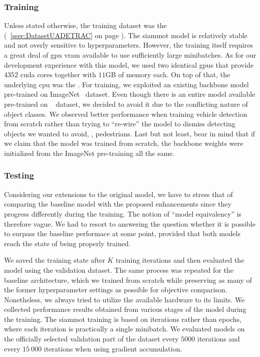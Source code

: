 \subsubsection{Training}

Unless stated otherwise, the training dataset was the \uadetrac{} (\sectiontext{}~\ref{ssec:DatasetUADETRAC} on page \pageref{ssec:DatasetUADETRAC}). The \gls{siammot} model is relatively stable and not overly sensitive to hyperparameters. However, the training itself requires a great deal of \gls{gpu} \gls{vram} available to use sufficiently large minibatches. As for our development experience with this model, we used two identical \usedgpu{} \glspl{gpu} that provide $4352$ \gls{cuda} cores together with $11$GB of memory each. On top of that, the underlying \gls{cpu} was the \usedcpu{}. For training, we exploited an existing backbone model pre-trained on ImageNet~\cite{deng2009imagenet} dataset. Even though there is an entire model available pre-trained on \mscoco{}~\cite{lin2014mscoco} dataset, we decided to avoid it due to the conflicting nature of object classes. We observed better performance when training vehicle detection from scratch rather than trying to ``re-wire'' the model to dismiss detecting objects we wanted to avoid, \egtext{}, pedestrians. Last but not least, bear in mind that if we claim that the model was trained from scratch, the backbone weights were initialized from the ImageNet pre-training all the same.

\subsubsection{Testing}

Considering our extensions to the original model, we have to stress that of comparing the baseline model with the proposed enhancements since they progress differently during the training. The notion of ``model equivalency'' is therefore vague. We had to resort to answering the question whether it is possible to surpass the baseline performace at some point, provided that both models reach the state of being properly trained.

We saved the training state after $K$ training iterations and then evaluated the model using the \uadetrac{} validation dataset. The same process was repeated for the baseline architecture, which we trained from scratch while preserving as many of the former hyperparameter settings as possible for objective comparison. Nonetheless, we always tried to utilize the available hardware to its limits. We collected performance results obtained from various stages of the model during the training. The \gls{siammot} training is based on iterations rather than epochs, where each iteration is practically a single minibatch. We evaluated models on the officially selected validation part of the dataset every $5000$ iterations and every $15\ 000$ iterations when using gradient accumulation.
